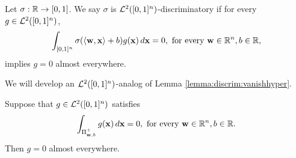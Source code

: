\begin{definition}
Let $\sigma : {\mathbb R} \to [0,1]$. We say $\sigma$ is ${\mathcal {L}^2}([0,1]^n)$-discriminatory if for every $g \in {\mathcal {L}^2}([0,1]^n)$, \[
    \int_{[0,1]^n} \sigma(\langle \mathbf{w}, \mathbf{x} \rangle + b) g(\mathbf{x}) \, d \mathbf{x} = 0, \text{ for every } \mathbf{w} \in {\mathbb R}^n, b \in {\mathbb R},
\]
implies $g = 0$ almost everywhere.
\end{definition}
We will develop an ${\mathcal {L}^2}([0,1]^n)$-analog of Lemma \ref{lemma:discrim:vanishhyper}.
\begin{lemma}
\label{lemma:universality:l2:vanishhyper}
Suppose that $g \in {\mathcal {L}^2}([0,1]^n)$ satisfies\begin{align}
     \label{eqn:universality:l2:vanishhyper:assumption}
     \int_{\Pi_{\mathbf{w}, b}^{+}} g(\mathbf{x}) \, d\mathbf{x} = 0, \text{ for every } \mathbf{w} \in {\mathbb R}^n, b \in {\mathbb R}.
\end{align}
Then $g = 0$ almost everywhere.
\end{lemma}

